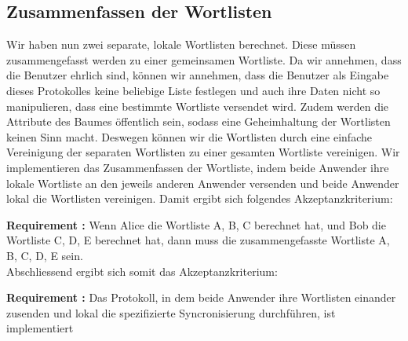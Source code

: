 \documentclass{article}
\newcounter{requirementscount}{}
\newcommand{\requirement}[1] {
        \addtocounter{requirementscount}{1}
        {\bf Requirement \therequirementscount:} #1\\
    }
\begin{document}
\subsection{Zusammenfassen der Wortlisten}
Wir haben nun zwei separate, lokale Wortlisten berechnet. Diese m\"ussen
zusammengefasst werden zu einer gemeinsamen Wortliste. Da wir annehmen, dass
die Benutzer ehrlich sind, k\"onnen wir annehmen, dass die Benutzer als
Eingabe dieses Protokolles keine beliebige Liste festlegen und auch ihre
Daten nicht so manipulieren, dass eine bestimmte Wortliste versendet wird.
Zudem werden die Attribute des Baumes \"offentlich sein, sodass eine
Geheimhaltung der Wortlisten keinen Sinn macht.
Deswegen k\"onnen wir die Wortlisten durch eine einfache Vereinigung der
separaten Wortlisten zu einer gesamten Wortliste vereinigen. Wir implementieren
 das Zusammenfassen der Wortliste, indem beide Anwender ihre
lokale Wortliste an den jeweils anderen Anwender versenden und beide 
Anwender lokal die Wortlisten vereinigen. Damit ergibt sich folgendes
Akzeptanzkriterium:\\
\requirement{Wenn Alice die Wortliste A, B, C berechnet hat, und Bob die
Wortliste C, D, E berechnet hat, dann muss die zusammengefasste Wortliste
A, B, C, D, E sein.} 

Abschliessend ergibt sich somit das Akzeptanzkriterium:\\
\requirement{Das Protokoll, in dem beide Anwender ihre Wortlisten einander
zusenden und lokal die spezifizierte Syncronisierung durchf\"uhren, ist
implementiert}

\pagebreak %
\end{document}
